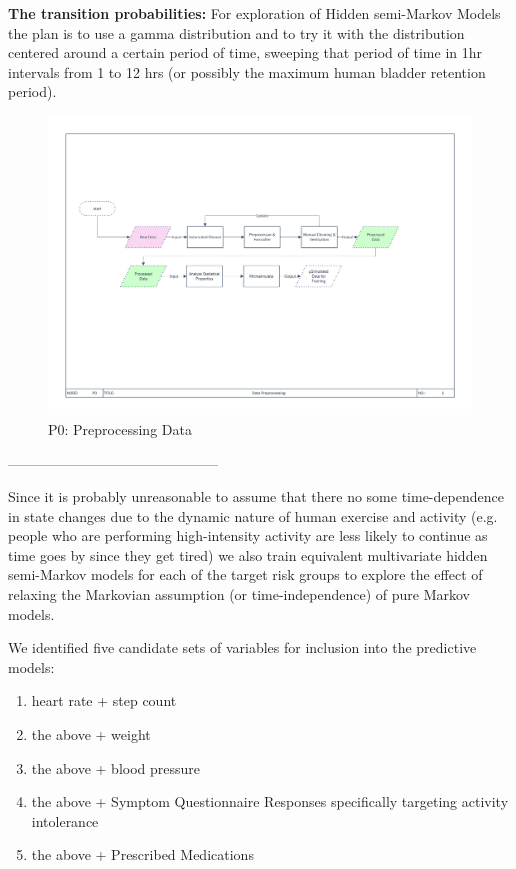 \documentclass[]{article}
\begin{document}
\textbf{The transition probabilities:} For exploration of Hidden semi-Markov Models the plan is to use a gamma distribution and to try it with the distribution centered around a certain period of time, sweeping that period of time in 1hr intervals from 1 to 12 hrs (or possibly the maximum human bladder retention period).

\clearpage
\begin{landscape}
	\begin{figure}
		\centering
		\includegraphics[scale=0.32]{../modelDevelopmentFlowcharts/P0-Preprocessing_Data.png}
		\caption{P0: Preprocessing Data}
		\label{fig:label}
	\end{figure}
\end{landscape}

---------------------------------------------

Since it is probably unreasonable to assume that there no some time-dependence in state changes due to the dynamic nature of human exercise and activity (e.g. people who are performing high-intensity activity are less likely to continue as time goes by since they get tired) we also train equivalent multivariate hidden semi-Markov models for each of the target risk groups to explore the effect of relaxing the Markovian assumption (or time-independence) of pure Markov models.

We identified five candidate sets of variables for inclusion into the predictive models:
\begin{enumerate}
	\item heart rate + step count
	\item the above + weight
	\item the above + blood pressure
	\item the above + Symptom Questionnaire Responses specifically targeting activity intolerance
	\item the above + Prescribed Medications
\end{enumerate}
\end{document}
